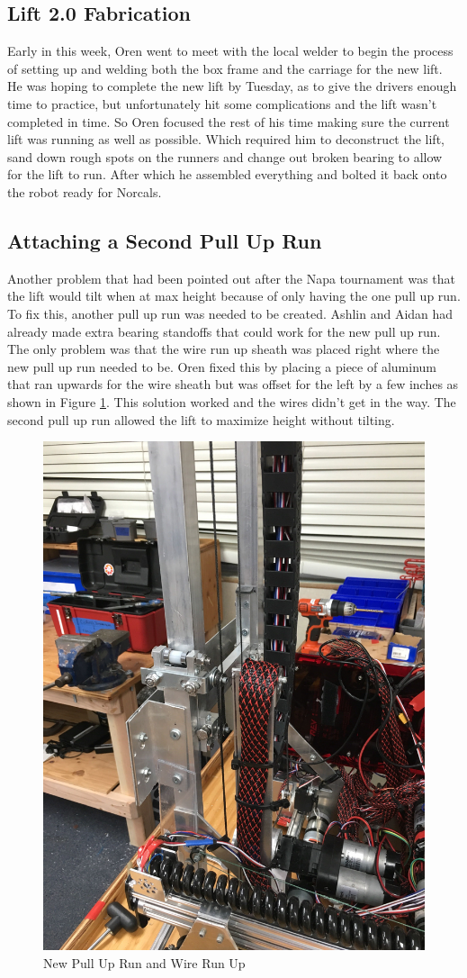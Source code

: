 \documentclass{article}
\begin{document}
\subsection{Lift 2.0 Fabrication}
Early in this week, Oren went to meet with the local welder to begin the process of setting up and welding both the box frame and the carriage for the new lift. He was hoping to complete the new lift by Tuesday, as to give the drivers enough time to practice, but unfortunately hit some complications and the lift wasn't completed in time. So Oren focused the rest of his time making sure the current lift was running as well as possible. Which required him to deconstruct the lift, sand down rough spots on the runners and change out broken bearing to allow for the lift to run. After which he assembled everything and bolted it back onto the robot ready for Norcals. 

\subsection{Attaching a Second Pull Up Run}
Another problem that had been pointed out after the Napa tournament was that the lift would tilt when at max height because of only having the one pull up run. To fix this, another pull up run was needed to be created. Ashlin and Aidan had already made extra bearing standoffs that could work for the new pull up run. The only problem was that the wire run up sheath was placed right where the new pull up run needed to be. Oren fixed this by placing a piece of aluminum that ran upwards for the wire sheath but was offset for the left by a few inches as shown in Figure \ref{fig:PullUp}. This solution worked and the wires didn't get in the way. The second pull up run allowed the lift to maximize height without tilting.

\begin{figure}
    \centering
    \includegraphics[width= 0.5 \textwidth]{26_02-25/images/PullUpRun2.jpg}
    \caption{New Pull Up Run and Wire Run Up}
    \label{fig:PullUp}
\end{figure}
\end{document}
